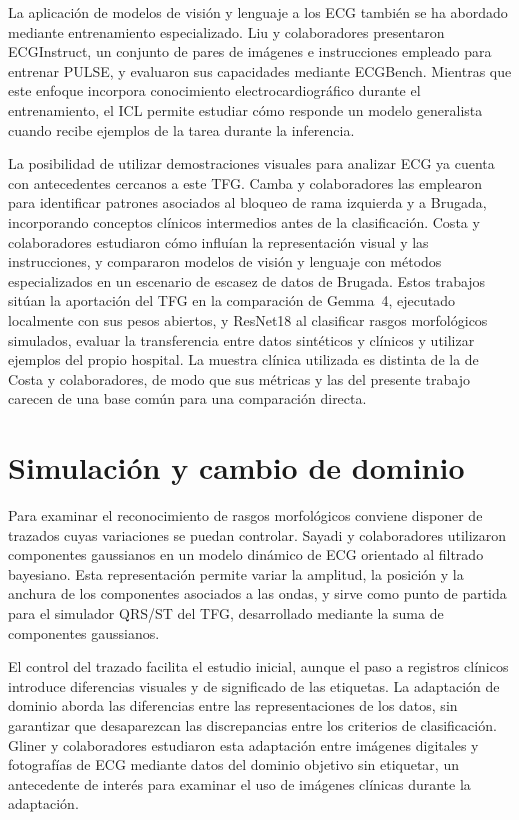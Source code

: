 La aplicación de modelos de visión y lenguaje a los ECG también se ha abordado mediante entrenamiento especializado. Liu y colaboradores presentaron ECGInstruct, un conjunto de pares de imágenes e instrucciones empleado para entrenar PULSE, y evaluaron sus capacidades mediante ECGBench. Mientras que este enfoque incorpora conocimiento electrocardiográfico durante el entrenamiento, el ICL permite estudiar cómo responde un modelo generalista cuando recibe ejemplos de la tarea durante la inferencia. \cite{liu2026}

La posibilidad de utilizar demostraciones visuales para analizar ECG ya cuenta con antecedentes cercanos a este TFG. Camba y colaboradores las emplearon para identificar patrones asociados al bloqueo de rama izquierda y a Brugada, incorporando conceptos clínicos intermedios antes de la clasificación. Costa y colaboradores estudiaron cómo influían la representación visual y las instrucciones, y compararon modelos de visión y lenguaje con métodos especializados en un escenario de escasez de datos de Brugada. Estos trabajos sitúan la aportación del TFG en la comparación de Gemma~4, ejecutado localmente con sus pesos abiertos, y ResNet18 al clasificar rasgos morfológicos simulados, evaluar la transferencia entre datos sintéticos y clínicos y utilizar ejemplos del propio hospital. La muestra clínica utilizada es distinta de la de Costa y colaboradores, de modo que sus métricas y las del presente trabajo carecen de una base común para una comparación directa. \cite{camba2026icl,costa2026fewshot}

\section{Simulación y cambio de dominio}

\label{sec:antecedentes_adaptacion}

\label{sec:antecedentes_adaptacion_cnn}

Para examinar el reconocimiento de rasgos morfológicos conviene disponer de trazados cuyas variaciones se puedan controlar. Sayadi y colaboradores utilizaron componentes gaussianos en un modelo dinámico de ECG orientado al filtrado bayesiano. Esta representación permite variar la amplitud, la posición y la anchura de los componentes asociados a las ondas, y sirve como punto de partida para el simulador QRS/ST del TFG, desarrollado mediante la suma de componentes gaussianos. \cite{sayadi2010}

El control del trazado facilita el estudio inicial, aunque el paso a registros clínicos introduce diferencias visuales y de significado de las etiquetas. La adaptación de dominio aborda las diferencias entre las representaciones de los datos, sin garantizar que desaparezcan las discrepancias entre los criterios de clasificación. Gliner y colaboradores estudiaron esta adaptación entre imágenes digitales y fotografías de ECG mediante datos del dominio objetivo sin etiquetar, un antecedente de interés para examinar el uso de imágenes clínicas durante la adaptación. \cite{gliner2023}

